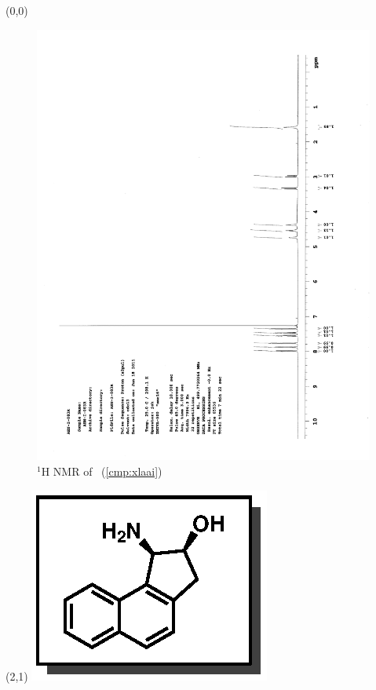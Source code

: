 \begin{textblock}{20}(0,0)
\begin{figure}[htb]
\caption{$^1$H NMR of \CMPxlaai\ (\ref{cmp:xlaai})}
\includegraphics[scale=0.75, trim = 0mm 0mm 0mm 5mm,
clip]{chp_asymmetric/images/nmr/xlaaiH}
\vspace{-100pt}
\end{figure}
\end{textblock}
\begin{textblock}{1}(2,1)
\includegraphics[scale=0.8, angle=90]{chp_asymmetric/images/xlaai}
\end{textblock}
